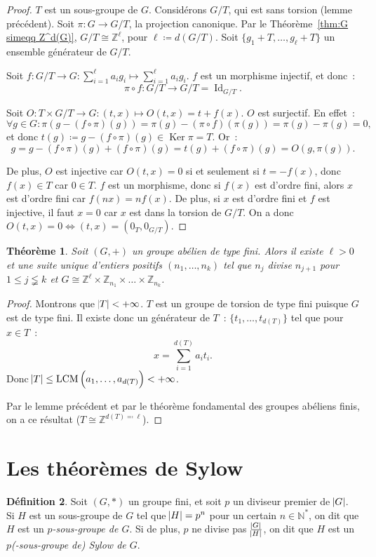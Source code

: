 \documentclass{article}
\newtheorem{thm}{Théorème}[section]
\theoremstyle{definition}
\newtheorem{déf}[thm]{Définition}
\theoremstyle{remark}
\DeclareMathOperator{\Id}{Id}
\DeclareMathOperator{\Ker}{Ker}
\DeclareMathOperator{\LCM}{LCM}
\newcommand{\Z}{\mathbb Z}
\newcommand{\N}{\mathbb N}
\newcommand{\simeqq}{\cong}
\begin{document}
		\begin{proof} $T$ est un sous-groupe de $G$. Considérons $G/T$, qui est sans torsion (lemme précédent). Soit $\pi : G \to G/T$, la projection canonique.
		Par le Théorème~\ref{thm:G simeqq Z^d(G)}, $G/T \simeqq \Z^\ell$, pour $\ell \coloneqq d(G/T)$. Soit $\{g_1+T, \ldots, g_\ell+T\}$ un ensemble
		générateur de $G/T$.

		Soit $f : G/T \to G : \sum_{i=1}^\ell a_ig_i \mapsto \sum_{i=1}^\ell a_ig_i$. $f$ est un morphisme injectif, et donc~:
		\[\pi \circ f : G/T \to G/T = \Id_{G/T}.\]

		Soit $O : T \times G/T \to G : (t, x) \mapsto O(t, x) = t+f(x)$. $O$ est surjectif. En effet~:
		\[\forall g \in G : \pi(g-(f \circ \pi)(g)) = \pi(g) - (\pi \circ f)(\pi(g)) = \pi(g) - \pi(g) = 0,\]
		et donc $t(g) \coloneqq g - (f \circ \pi)(g) \in \Ker \pi = T$. Or~:
		\[g = g - (f \circ \pi)(g) + (f \circ \pi)(g) = t(g) + (f \circ \pi)(g) = O(g, \pi(g)).\]

		De plus, $O$ est injective car $O(t, x) = 0$ si et seulement si $t = -f(x)$, donc $f(x) \in T$ car $0 \in T$. $f$ est un morphisme, donc si $f(x)$ est
		d'ordre fini, alors $x$ est d'ordre fini car $f(nx) = nf(x)$. De plus, si $x$ est d'ordre fini et $f$ est injective, il faut $x=0$ car $x$ est dans
		la torsion de $G/T$. On a donc $O(t, x) = 0 \iff (t, x) = (0_T, 0_{G/T})$.
		\end{proof}

		\begin{thm} Soit $(G, +)$ un groupe abélien de type fini. Alors il existe $\ell > 0$ et une suite unique d'entiers positifs $(n_1, \ldots, n_k)$
		tel que $n_j$ divise $n_{j+1}$ pour $1  \leq j \lneqq k$ et $G \simeqq \Z^\ell \times \Z_{n_1} \times \ldots \times \Z_{n_k}$.
		\end{thm}

		\begin{proof} Montrons que $\abs T < +\infty$. $T$ est un groupe de torsion de type fini puisque $G$ est de type fini.
		Il existe donc un générateur de $T$~: $\{t_1, \ldots, t_{d(T)}\}$ tel que pour $x \in T$~:
		\[x = \sum_{i=1}^{d(T)}a_it_i.\]
		Donc $\abs T \leq \LCM\left(a_1, \ldots, a_{d(T)}\right) < +\infty$.

		Par le lemme précédent et par le théorème fondamental des groupes abéliens finis, on a ce résultat ($T \simeqq \Z^{d(T) \eqqcolon \ell}$).
		\end{proof}

\section{Les théorèmes de Sylow}
	\begin{déf} Soit $(G, *)$ un groupe fini, et soit $p$ un diviseur premier de $\abs G$. Si $H$ est un sous-groupe de $G$ tel que $\abs H = p^n$ pour un
	certain $n \in \N^*$, on dit que $H$ est un \textit{$p$-sous-groupe de $G$}. Si de plus, $p$ ne divise pas $\frac {\abs G}{\abs H}$, on dit que $H$ est un
	\textit{$p$(-sous-groupe de) Sylow de $G$}.
	\end{déf}
\end{document}
